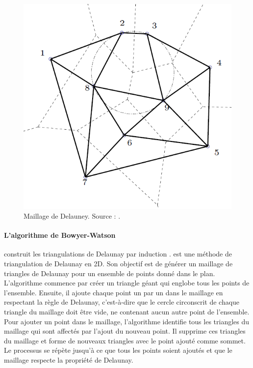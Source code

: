 \begin{figure}[!h]
    \centering
    \includegraphics[scale=0.55]{images/Maillage_delauney.png}
    \caption{Maillage de Delauney. Source : \cite{hecht2007maillage}.}
    \label{fig:maillage_delauney}
\end{figure}

\paragraph{L'algorithme de Bowyer-Watson} construit les triangulations de Delaunay par induction \cite{bowyer1981computing, watson1981computing, ern2004theory}.
 est une méthode de triangulation de Delaunay en 2D. Son objectif est de générer un maillage de triangles de Delaunay pour un ensemble de points donné dans le plan. L'algorithme commence par créer un triangle géant qui englobe tous les points de l'ensemble. Ensuite, il ajoute chaque point un par un dans le maillage en respectant la règle de Delaunay, c'est-à-dire que le cercle circonscrit de chaque triangle du maillage doit être vide, ne contenant aucun autre point de l'ensemble. Pour ajouter un point dans le maillage, l'algorithme identifie tous les triangles du maillage qui sont affectés par l'ajout du nouveau point. Il supprime ces triangles du maillage et forme de nouveaux triangles avec le point ajouté comme sommet. Le processus se répète jusqu'à ce que tous les points soient ajoutés et que le maillage respecte la propriété de Delaunay.

